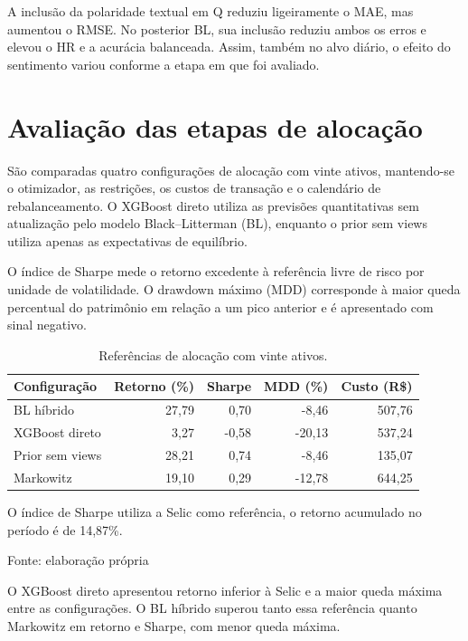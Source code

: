 A inclusão da polaridade textual em Q reduziu ligeiramente
o MAE, mas aumentou o RMSE. No posterior BL, sua inclusão
reduziu ambos os erros e elevou o HR e a acurácia balanceada.
Assim, também no alvo diário, o efeito do sentimento variou
conforme a etapa em que foi avaliado.

\section{Avaliação das etapas de alocação}
\label{sec:etapas_alocacao}
São comparadas quatro configurações de alocação com vinte
ativos, mantendo-se o otimizador, as restrições, os custos
de transação e o calendário de rebalanceamento. O XGBoost
direto utiliza as previsões quantitativas sem atualização
pelo modelo Black--Litterman (BL), enquanto o prior sem
views utiliza apenas as expectativas de equilíbrio.

O índice de Sharpe mede o retorno excedente à referência
livre de risco por unidade de volatilidade. O drawdown
máximo (MDD) corresponde à maior queda percentual do
patrimônio em relação a um pico anterior e é apresentado
com sinal negativo.

\begin{table}[H]
\centering
\caption{Referências de alocação com vinte ativos.}
\label{tab:etapas_alocacao}
{\footnotesize
\renewcommand{\arraystretch}{1}
\begin{tabular}{@{}lrrrr@{}}
\hline
Configuração & Retorno (\%) & Sharpe & MDD (\%) & Custo (R\$) \\
\hline
BL híbrido       & 27,79 &  0,70 &  -8,46 & 507,76 \\
XGBoost direto   &  3,27 & -0,58 & -20,13 & 537,24 \\
Prior sem views  & 28,21 &  0,74 &  -8,46 & 135,07 \\
Markowitz        & 19,10 &  0,29 & -12,78 & 644,25 \\
\hline
\end{tabular}
}
\par\smallskip
{\footnotesize
O índice de Sharpe utiliza a Selic como referência, o retorno acumulado no período é de 14,87\%.
\par}
\smallskip
Fonte: elaboração própria
\end{table}

O XGBoost direto apresentou retorno inferior à Selic e
a maior queda máxima entre as configurações. O BL híbrido
superou tanto essa referência quanto Markowitz em retorno
e Sharpe, com menor queda máxima.

